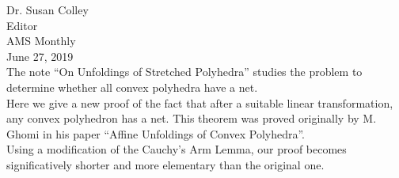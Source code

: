 \documentclass[openright, 12pt]{book}
\begin{document}
Dr. Susan Colley\\
Editor\\
AMS Monthly\\

\noindent June 27, 2019\\

\noindent The note ``On Unfoldings of Stretched Polyhedra'' studies the problem to determine whether all convex polyhedra have a net.\\

Here we give a new proof of the fact that after a suitable linear transformation, any convex polyhedron has a net. This theorem was proved originally by M. Ghomi in his paper ``Affine Unfoldings of Convex Polyhedra''.\\


Using a modification of the Cauchy's Arm Lemma, our proof becomes significatively shorter and more elementary than the original one.\\
\end{document}
